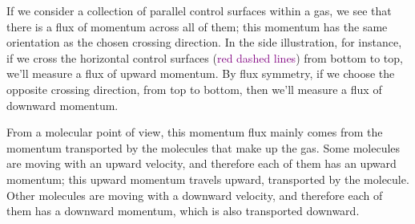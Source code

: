 \documentclass[a4paper,12pt,%
onecolumn,oneside,titlepage,%
british%
]{memoir}
\renewcommand*{\|}[1][]{\nonscript\:#1\vert\nonscript\:\mathopen{}}
\begin{document}
%
If we consider a collection of parallel control surfaces within a gas, we see that there is a flux of momentum across all of them; this momentum has the same orientation as the chosen crossing direction. In the side illustration, for instance, if we cross the horizontal control surfaces (\textcolor{purple}{red dashed lines}) from bottom to top, we'll measure a flux of upward momentum. By flux symmetry, if we choose the opposite crossing direction, from top to bottom, then we'll measure a flux of downward momentum.

From a molecular point of view, this momentum flux mainly comes from the momentum transported by the molecules that make up the gas. Some molecules are moving with an upward velocity, and therefore each of them has an upward momentum; this upward momentum travels upward, transported by the molecule. Other molecules are moving with a downward velocity, and therefore each of them has a downward momentum, which is also transported downward.

\medskip
\end{document}
